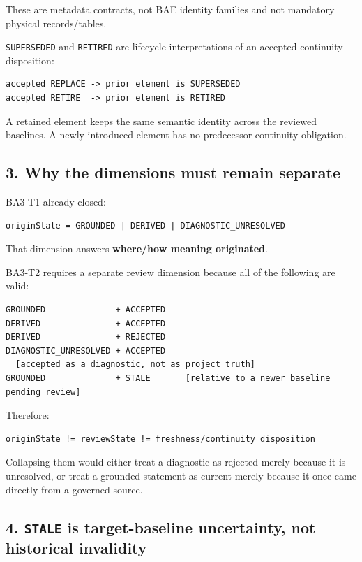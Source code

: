 \documentclass[11pt,a4paper]{article}
\begin{document}
These are metadata contracts, not BAE identity families and not
mandatory physical records/tables.

\texttt{SUPERSEDED} and \texttt{RETIRED} are lifecycle interpretations
of an accepted continuity disposition:

\begin{verbatim}
accepted REPLACE -> prior element is SUPERSEDED
accepted RETIRE  -> prior element is RETIRED
\end{verbatim}

A retained element keeps the same semantic identity across the reviewed
baselines. A newly introduced element has no predecessor continuity
obligation.

\subsection{3. Why the dimensions must remain
separate}\label{why-the-dimensions-must-remain-separate}

BA3-T1 already closed:

\begin{verbatim}
originState = GROUNDED | DERIVED | DIAGNOSTIC_UNRESOLVED
\end{verbatim}

That dimension answers \textbf{where/how meaning originated}.

BA3-T2 requires a separate review dimension because all of the following
are valid:

\begin{verbatim}
GROUNDED              + ACCEPTED
DERIVED               + ACCEPTED
DERIVED               + REJECTED
DIAGNOSTIC_UNRESOLVED + ACCEPTED
  [accepted as a diagnostic, not as project truth]
GROUNDED              + STALE       [relative to a newer baseline pending review]
\end{verbatim}

Therefore:

\begin{verbatim}
originState != reviewState != freshness/continuity disposition
\end{verbatim}

Collapsing them would either treat a diagnostic as rejected merely
because it is unresolved, or treat a grounded statement as current
merely because it once came directly from a governed source.

\subsection{\texorpdfstring{4. \texttt{STALE} is target-baseline
uncertainty, not historical
invalidity}{4. STALE is target-baseline uncertainty, not historical invalidity}}\label{stale-is-target-baseline-uncertainty-not-historical-invalidity}
\end{document}
